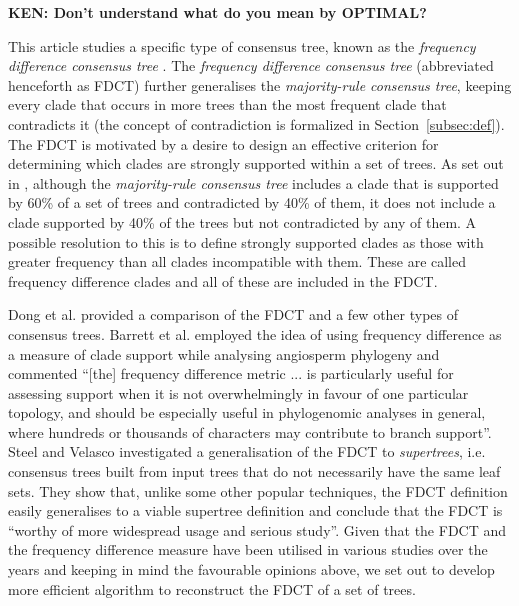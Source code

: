 \documentclass[final,1p,times]{elsarticle}
\begin{document}
    {\bf KEN: Don't understand what do you mean by OPTIMAL?}

    This article studies a specific type of consensus tree, known as the \textit{frequency difference consensus tree} \cite{goloboff2003improvements}. The \textit{frequency difference consensus tree} (abbreviated henceforth as FDCT) further generalises the \textit{majority-rule consensus tree}, keeping every clade that occurs in more trees than the most frequent clade that contradicts it (the concept of contradiction is formalized in Section~\ref{subsec:def}). The FDCT is motivated by a desire to design an effective criterion for determining which clades are strongly supported within a set of trees. As set out in \cite{goloboff2003improvements}, although the \textit{majority-rule consensus tree} includes a clade that is supported by 60\% of a set of trees and contradicted by 40\% of them, it does not include a clade supported by 40\% of the trees but not contradicted by any of them. A possible resolution to this is to define strongly supported clades as those with greater frequency than all clades incompatible with them. These are called frequency difference clades and all of these are included in the FDCT.

    Dong et al. \cite{dong2010majority} provided a comparison of the FDCT and a few other types of consensus trees. Barrett et al. \cite{barrett2013plastid} employed the idea of using frequency difference as a measure of clade support while analysing angiosperm phylogeny and commented ``[the] frequency difference metric ... is particularly useful for assessing support when it is not overwhelmingly in favour of one particular topology, and should be especially useful in phylogenomic analyses in general, where hundreds or thousands of characters may contribute to branch support''. Steel and Velasco \cite{steel2014axiomatic} investigated a generalisation of the FDCT to \textit{supertrees}, i.e. consensus trees built from input trees that do not necessarily have the same leaf sets. They show that, unlike some other popular techniques, the FDCT definition easily generalises to a viable supertree definition and conclude that the FDCT is ``worthy of more widespread usage and serious study''. Given that the FDCT and the frequency difference measure have been utilised in various studies over the years \cite{garcia2014testing,barrett2013plastid,molineri2010cladistic,molineri2013phylogeny,molineri2015phylogeny,lindqvist2006molecular,han2014new} and keeping in mind the favourable opinions above, we set out to develop more efficient algorithm to reconstruct the FDCT of a set of trees.
\end{document}
